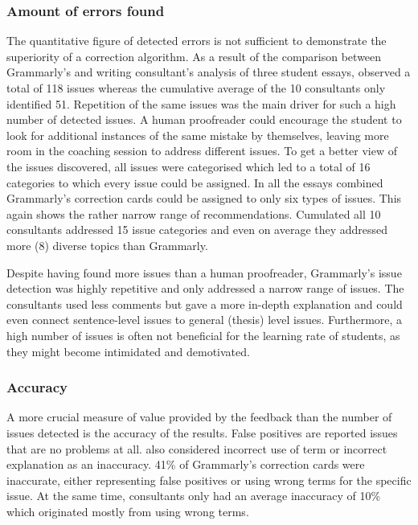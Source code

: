 \documentclass[runningheads]{llncs}
\let\OldTextregistered\textregistered
\renewcommand{\textregistered}{\OldTextregistered\xspace}%
\begin{document}
\subsubsection{Amount of errors found}
The quantitative figure of detected errors is not sufficient to demonstrate the superiority of a correction algorithm. As a result of the comparison between Grammarly\textregistered's and writing consultant's analysis of three student essays, \textcite{dembsey_closing_2017} observed a total of 118 issues whereas the cumulative average of the 10 consultants only identified 51. Repetition of the same issues was the main driver for such a high number of detected issues. A human proofreader could encourage the student to look for additional instances of the same mistake by themselves, leaving more room in the coaching session to address different issues. To get a better view of the issues discovered, all issues were categorised which led to a total of 16 categories to which every issue could be assigned. In all the essays combined Grammarly\textregistered's correction cards could be assigned to only six types of issues. This again shows the rather narrow range of recommendations. Cumulated all 10 consultants addressed 15 issue categories and even on average they addressed more (8) diverse topics than Grammarly\textregistered.

Despite having found more issues than a human proofreader, Grammarly\textregistered's issue detection was highly repetitive and only addressed a narrow range of issues. The consultants used less comments but gave a more in-depth explanation and could even connect sentence-level issues to general (thesis) level issues. Furthermore, a high number of issues is often not beneficial for the learning rate of students, as they might become intimidated and demotivated. 
\citep{dembsey_closing_2017}


\subsubsection{Accuracy}
A more crucial measure of value provided by the feedback than the number of issues detected is the accuracy of the results. False positives are reported issues that are no problems at all. \textcite{dembsey_closing_2017} also considered incorrect use of term or incorrect explanation as an inaccuracy. 41\% of Grammarly\textregistered's correction cards were inaccurate, either representing false positives or using wrong terms for the specific issue. At the same time, consultants only had an average inaccuracy of 10\% which originated mostly from using wrong terms.
\citep{dembsey_closing_2017}
\end{document}
